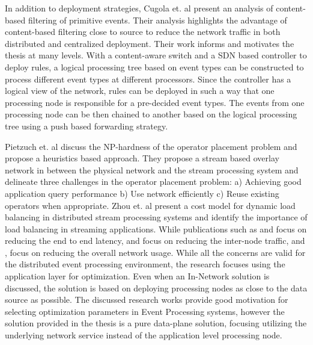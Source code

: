 In addition to deployment strategies, Cugola et. al present an analysis of content-based filtering of primitive events. Their analysis highlights the advantage of content-based filtering close to source to reduce the network traffic in both distributed and centralized deployment. Their work informs and motivates the thesis at many levels. With a content-aware switch and a SDN based controller to deploy rules, a logical processing tree based on event types can be constructed to process different event types at different processors.  Since the controller has a logical view of the network, rules can be deployed in such a way that one processing node is responsible for a pre-decided event types. The events from one processing node can be then chained to another based on the logical processing tree using a push based forwarding strategy.\newline 

Pietzuch et. al \cite{pietzuch2006network} discuss the NP-hardness of the operator placement problem and propose a heuristics based approach. They propose a stream based overlay network in between the physical network and the stream processing system and delineate three challenges in the operator placement problem: a) Achieving good application query performance b) Use network efficiently c) Reuse existing operators when appropriate. Zhou et. al \cite{zhou2006efficient} present a cost model for dynamic load balancing in distributed stream processing systems and identify the importance of load balancing in streaming applications. While publications such as \cite{backman2012managing} and \cite{chatzistergiou2014fast} focus on reducing the end to end latency, \cite{aniello2013adaptive} and \cite{cui2016big} focus on reducing the inter-node traffic, and \cite{rizou2010solving}, \cite{pietzuch2006network} focus on reducing the overall network usage. While all the concerns are valid for the distributed event processing environment, the research focuses using the application layer for optimization. Even when an In-Network solution is discussed, the solution is based on deploying processing nodes as close to the data source as possible. The discussed research works provide good  motivation for selecting optimization parameters in Event Processing systems, however the solution provided in the thesis is a pure data-plane solution, focusing utilizing the underlying network service instead of the application level processing node.


